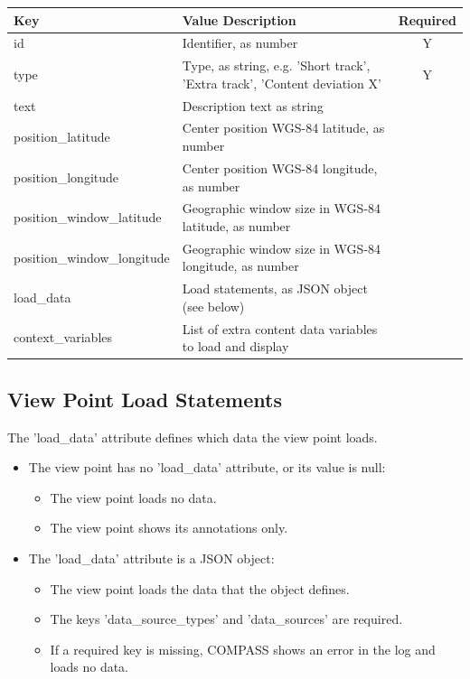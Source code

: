 \begin{center}
 \begin{table}[H]
  \begin{tabularx}{\textwidth}{ | l | X | c | }
    \hline
    \textbf{Key} & \textbf{Value Description} & \textbf{Required} \\ \hline
    id & Identifier, as number & Y \\ \hline
    type & Type, as string, e.g. 'Short track', 'Extra track', 'Content deviation X' & Y   \\ \hline
    text & Description text as string &    \\ \hline
    position\_latitude & Center position WGS-84 latitude, as number &    \\ \hline
    position\_longitude & Center position WGS-84 longitude, as number &    \\ \hline
    position\_window\_latitude & Geographic window size in WGS-84 latitude, as number &    \\ \hline
    position\_window\_longitude & Geographic window size in WGS-84 longitude, as number &    \\ \hline
    load\_data & Load statements, as JSON object (see below) &    \\ \hline
    context\_variables & List of extra content data variables to load and display &    \\ \hline
\end{tabularx}
\end{table}
\end{center}

\subsection{View Point Load Statements}
\label{sec:appendix_view_points_load_data}

The 'load\_data' attribute defines which data the view point loads. \\

\begin{itemize}
\item The view point has no 'load\_data' attribute, or its value is null:
\begin{itemize}
\item The view point loads no data.
\item The view point shows its annotations only.
\end{itemize}
\item The 'load\_data' attribute is a JSON object:
\begin{itemize}
\item The view point loads the data that the object defines.
\item The keys 'data\_source\_types' and 'data\_sources' are required.
\item If a required key is missing, COMPASS shows an error in the log and loads no data.
\end{itemize}
\end{itemize}

